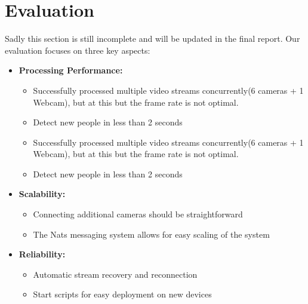 \documentclass[conference]{IEEEtran}
\begin{document}
\section{Evaluation}
\label{sec:evaluation}
Sadly this section is still incomplete and will be updated in the final report.
Our evaluation focuses on three key aspects:

\begin{itemize}
      \item \textbf{Processing Performance:} 
            \begin{itemize}
	\item Successfully processed multiple video streams concurrently(6 cameras + 1 Webcam), but at this but the frame rate is not optimal.
	\item Detect new people in less than 2 seconds  
		\item Successfully processed multiple video streams concurrently(6 cameras + 1 Webcam), but at this but the frame rate is not optimal.
	\item Detect new people in less than 2 seconds  
\end{itemize}

\item \textbf{Scalability:}
\begin{itemize}
	\item Connecting additional cameras should be straightforward
	\item The Nats messaging system allows for easy scaling of the system
\end{itemize}
\item \textbf{Reliability:}
\begin{itemize}
	\item Automatic stream recovery and reconnection
	\item Start scripts for easy deployment on new devices
\end{itemize}
\end{itemize}
\end{document}
